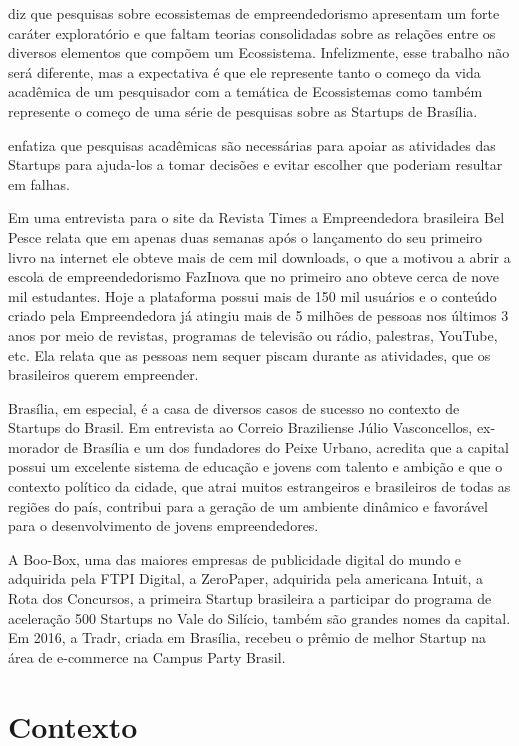  diz que pesquisas sobre ecossistemas de empreendedorismo apresentam um forte caráter exploratório e que faltam teorias consolidadas sobre as relações entre os diversos elementos que compõem um Ecossistema. Infelizmente, esse trabalho não será diferente, mas a expectativa é que ele represente tanto o começo da vida acadêmica de um pesquisador com a temática de Ecossistemas como também represente o começo de uma série de pesquisas sobre as Startups de Brasília. 

 enfatiza que pesquisas acadêmicas são necessárias para apoiar as atividades das Startups para ajuda-los a tomar decisões e evitar escolher que poderiam resultar em falhas.

Em uma entrevista para o site da Revista Times a Empreendedora brasileira Bel Pesce relata que em apenas duas semanas após o lançamento do seu primeiro livro na internet ele obteve mais de cem mil downloads, o que a motivou a abrir a escola de empreendedorismo FazInova que no primeiro ano obteve cerca de nove mil estudantes. Hoje a plataforma possui mais de 150 mil usuários e o conteúdo criado pela Empreendedora já atingiu mais de 5 milhões de pessoas nos últimos 3 anos por meio de revistas, programas de televisão ou rádio, palestras, YouTube, etc. Ela relata que as pessoas nem sequer piscam durante as atividades, que os brasileiros querem empreender.

Brasília, em especial, é a casa de diversos casos de sucesso no contexto de Startups do Brasil. Em entrevista ao Correio Braziliense Júlio Vasconcellos, ex-morador de Brasília e um dos fundadores do Peixe Urbano, acredita que a capital possui um excelente sistema de educação e jovens com talento e ambição e que o contexto político da cidade, que atrai muitos estrangeiros e brasileiros de todas as regiões do país, contribui para a geração de um ambiente dinâmico e favorável para o desenvolvimento de jovens empreendedores. 

A Boo-Box, uma das maiores empresas de publicidade digital do mundo e adquirida pela FTPI Digital, a ZeroPaper, adquirida pela americana Intuit, a Rota dos Concursos, a primeira Startup brasileira a participar do programa de aceleração 500 Startups no Vale do Silício, também são grandes nomes da capital. Em 2016, a Tradr, criada em Brasília, recebeu o prêmio de melhor Startup na área de e-commerce na Campus Party Brasil.

\section{Contexto}
\label{section:contexto}

